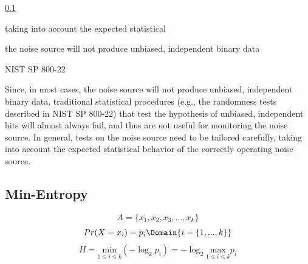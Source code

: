  

  \ref{sub:min-entropy}

 taking into account the
 expected statistical 

the noise source will not produce unbiased, independent binary data

NIST SP 800-22

Since, in most cases,
the noise source will not produce unbiased, independent binary data, traditional statistical
procedures (e.g., the randomness tests described in NIST SP 800-22) that test the hypothesis of
unbiased, independent bits will almost always fail, and thus are not useful for monitoring the noise
source. In general, tests on the noise source need to be tailored carefully, taking into account the
expected statistical behavior of the correctly operating noise source.

\subsection{Min-Entropy}\label{sub:min-entropy}

\begin{equation}
	A = \{x_1, x_2, x_3, ..., x_k\}
	\label{eq:min-ent-A}
\end{equation}
\begin{equation}
	Pr(X=x_i) = p_i 
	\Domain{i=\{1,...,k\}}
\end{equation}
\begin{equation}
	H = \underset{1\leq i\leq k}{\mathrm{min}}(-\log_2p_i) = -\log_2 \underset{1\leq i\leq k}{\mathrm{max}}p_i
\end{equation}



